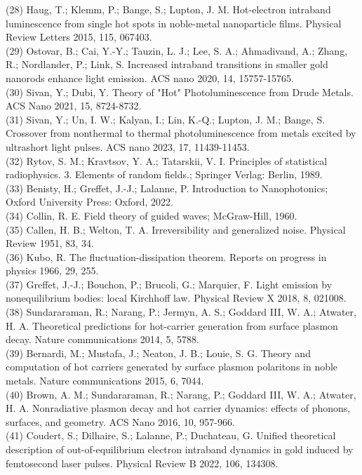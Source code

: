 \documentclass[10pt]{article}
\begin{document}
(28) Haug, T.; Klemm, P.; Bange, S.; Lupton, J. M. Hot-electron intraband luminescence from single hot spots in noble-metal nanoparticle films. Physical Review Letters 2015, 115, 067403.\\
(29) Ostovar, B.; Cai, Y.-Y.; Tauzin, L. J.; Lee, S. A.; Ahmadivand, A.; Zhang, R.; Nordlander, P.; Link, S. Increased intraband transitions in smaller gold nanorods enhance light emission. ACS nano 2020, 14, 15757-15765.\\
(30) Sivan, Y.; Dubi, Y. Theory of "Hot" Photoluminescence from Drude Metals. ACS Nano 2021, 15, 8724-8732.\\
(31) Sivan, Y.; Un, I. W.; Kalyan, I.; Lin, K.-Q.; Lupton, J. M.; Bange, S. Crossover from nonthermal to thermal photoluminescence from metals excited by ultrashort light pulses. ACS nano 2023, 17, 11439-11453.\\
(32) Rytov, S. M.; Kravtsov, Y. A.; Tatarskii, V. I. Principles of statistical radiophysics. 3. Elements of random fields.; Springer Verlag: Berlin, 1989.\\
(33) Benisty, H.; Greffet, J.-J.; Lalanne, P. Introduction to Nanophotonics; Oxford University Press: Oxford, 2022.\\
(34) Collin, R. E. Field theory of guided waves; McGraw-Hill, 1960.\\
(35) Callen, H. B.; Welton, T. A. Irreversibility and generalized noise. Physical Review 1951, 83, 34.\\
(36) Kubo, R. The fluctuation-dissipation theorem. Reports on progress in physics 1966, 29, 255.\\
(37) Greffet, J.-J.; Bouchon, P.; Brucoli, G.; Marquier, F. Light emission by nonequilibrium bodies: local Kirchhoff law. Physical Review X 2018, 8, 021008.\\
(38) Sundararaman, R.; Narang, P.; Jermyn, A. S.; Goddard III, W. A.; Atwater, H. A. Theoretical predictions for hot-carrier generation from surface plasmon decay. Nature communications 2014, 5, 5788.\\
(39) Bernardi, M.; Mustafa, J.; Neaton, J. B.; Louie, S. G. Theory and computation of hot carriers generated by surface plasmon polaritons in noble metals. Nature communications 2015, 6, 7044.\\
(40) Brown, A. M.; Sundararaman, R.; Narang, P.; Goddard III, W. A.; Atwater, H. A. Nonradiative plasmon decay and hot carrier dynamics: effects of phonons, surfaces, and geometry. ACS Nano 2016, 10, 957-966.\\
(41) Coudert, S.; Dilhaire, S.; Lalanne, P.; Duchateau, G. Unified theoretical description of out-of-equilibrium electron intraband dynamics in gold induced by femtosecond laser pulses. Physical Review B 2022, 106, 134308.\\
\end{document}
